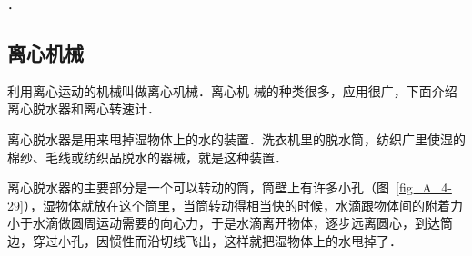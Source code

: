 ．

\subsection{离心机械}

利用离心运动的机械叫做离心机械．离心机
械的种类很多，应用很广，下面介绍离心脱水器和离心转速计．

离心脱水器是用来甩掉湿物体上的水的装置．洗衣机里的脱水筒，纺织广里使湿的棉纱、毛线或纺织品脱水的器械，就是这种装置．

离心脱水器的主要部分是一个可以转动的筒，筒壁上有许多小孔（图~\ref{fig_A_4-29}），湿物体就放在这个筒里，当筒转动得相当快的时候，水滴跟物体间的附着力小于水滴做圆周运动需要的向心力，于是水滴离开物体，逐步远离圆心，到达筒边，穿过小孔，因惯性而沿切线飞出，这样就把湿物体上的水甩掉了．


